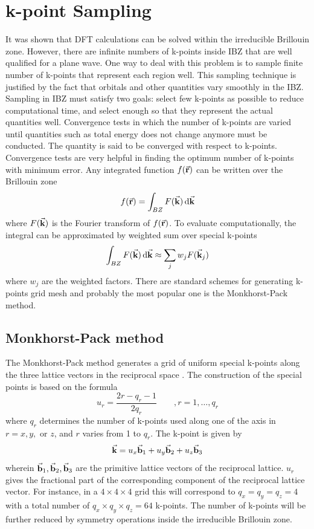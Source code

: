 \section{k-point Sampling}
It was shown that DFT calculations can be solved within the irreducible Brillouin zone. However, there are infinite numbers of k-points inside IBZ that are well qualified for a plane wave. One way to deal with this problem is to sample finite number of k-points that represent each region well. This sampling technique is justified by the fact that orbitals and other quantities vary smoothly in the IBZ. Sampling in IBZ must satisfy two goals: select few k-points as possible to reduce computational time, and select enough so that they represent the actual quantities well. Convergence tests  in which the  number of k-points are varied until quantities such as total energy does not change anymore must be conducted. The quantity is said to be converged with respect to k-points.  Convergence tests are very helpful in finding the optimum number of k-points with minimum error. Any integrated function $f(\va{r})$ can be written over the Brillouin zone
\begin{equation}
	f(\va{r}) = \int_{BZ} F(\va{k}) \dd{\va{k}}
\end{equation}
where $F(\va{k})$ is the Fourier transform of $f(\va{r})$. To evaluate computationally, the integral can be approximated by weighted sum over special k-points
\begin{equation}\label{eq:BZ_approx}
	\int_{BZ} F(\va{k}) \dd{\va{k}} \approx \sum_{j} w_{j}  F(\va{k}_j)
\end{equation}
where $w_{j}$ are the weighted factors.
There are standard schemes for generating k-points grid mesh and probably the most popular one is the Monkhorst-Pack method.

\subsection{Monkhorst-Pack method}
The Monkhorst-Pack method generates a grid of uniform special k-points along the three lattice vectors in the reciprocal space \citep{Monkhorst1976}. The construction of the special points is based on the formula
\begin{equation}
	u_{r} = \frac{2r - q_r -1}{2 q_r} \qquad , r = 1, \dots, q_r
\end{equation}
where $q_r$ determines the number of k-points  used along one of the axis in $r = x, y, {\text{ or }} z$, and  $r$ varies from 1 to $q_r$. The k-point is given by
\begin{equation}
	\va{k} = u_x \va{b}_1 + u_y \va{b}_2 + u_z \va{b}_3
\end{equation}
wherein $\va{b}_1, \va{b}_2, \va{b}_3$ are the primitive lattice vectors of the reciprocal lattice. $u_r$ gives the fractional part of the corresponding component of the reciprocal lattice vector. For instance, in a $4 \times 4 \times 4$ grid this will correspond to $q_x = q_y = q_z = 4$ with a total number of $q_x \times q_y \times q_z = 64$ k-points. The number of k-points will be further reduced by symmetry operations inside the irreducible Brillouin zone.


